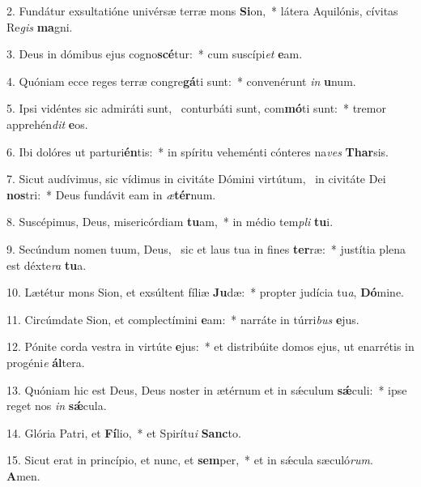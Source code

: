 2. Fundátur exsultatióne univérsæ terræ mons \textbf{Si}on,~*  látera Aquilónis, cívitas Re\textit{gis} \textbf{ma}gni.\

3. Deus in dómibus ejus cogno\textbf{scé}tur:~*  cum suscípi\textit{et} \textbf{e}am.\

4. Quóniam ecce reges terræ congre\textbf{gá}ti sunt:~*  convenérunt \textit{in} \textbf{u}num.\

5. Ipsi vidéntes sic admiráti sunt, \dag\  conturbáti sunt, com\textbf{mó}ti sunt:~*  tremor apprehén\textit{dit} \textbf{e}os.\

6. Ibi dolóres ut parturi\textbf{én}tis:~*  in spíritu veheménti cónteres na\textit{ves} \textbf{Thar}sis.\

7. Sicut audívimus, sic vídimus in civitáte Dómini virtútum, \dag\  in civitáte Dei \textbf{nos}tri:~*  Deus fundávit eam in \textit{æ}\textbf{tér}num.\

8. Suscépimus, Deus, misericórdiam \textbf{tu}am,~*  in médio tem\textit{pli} \textbf{tu}i.\

9. Secúndum nomen tuum, Deus, \dag\  sic et laus tua in fines \textbf{ter}ræ:~*  justítia plena est déxte\textit{ra} \textbf{tu}a.\

10. Lætétur mons Sion, et exsúltent fíliæ \textbf{Ju}dæ:~*  propter judícia tu\textit{a}, \textbf{Dó}mine.\

11. Circúmdate Sion, et complectímini \textbf{e}am:~*  narráte in túrri\textit{bus} \textbf{e}jus.\

12. Pónite corda vestra in virtúte \textbf{e}jus:~*  et distribúite domos ejus, ut enarrétis in progéni\textit{e} \textbf{ál}tera.\

13. Quóniam hic est Deus, Deus noster in ætérnum et in sǽculum \textbf{sǽ}culi:~*  ipse reget nos \textit{in} \textbf{sǽ}cula.\

14. Glória Patri, et \textbf{Fí}lio,~*  et Spirítu\textit{i} \textbf{Sanc}to.\

15. Sicut erat in princípio, et nunc, et \textbf{sem}per,~*  et in sǽcula sæculó\textit{rum}. \textbf{A}men.\

